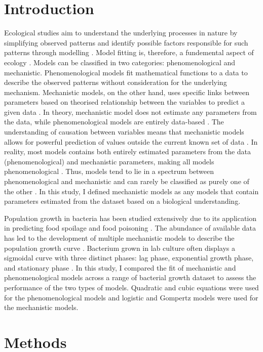 \documentclass[11pt, a4paper]{article}
\begin{document}
\section{Introduction}
Ecological studies aim to understand the underlying processes in nature by simplifying observed patterns and identify possible factors responsible for such patterns through modelling \cite{Johnson2004}. Model fitting is, therefore, a fundemental aspect of ecology \citep{Marquet2014}. Models can be classified in two categories: phenomenological and mechanistic. Phenomenological models fit mathematical functions to a data to describe the observed patterns without consideration for the underlying mechanism. Mechanistic models, on the other hand, uses specific links between parameters based on theorised relationship between the variables to predict a given data \cite{Jones2018}. In theory, mechanistic model does not estimate any parameters from the data, while phenomenological models are entirely data-based \citep{Lema-Perez2019}. The understanding of causation between variables means that mechanistic models allows for powerful prediction of values outside the current known set of data \cite{White2019}. In reality, most models contains both entirely estimated parameters from the data (phenomenological) and mechanistic parameters, making all models phenomenological \cite{White2019}. Thus, models tend to lie in a spectrum between phenomenological and mechanistic and can rarely be classified as purely one of the other \citep{Marquet2014}. In this study, I defined mechanistic models as any models that contain parameters estimated from the dataset based on a biological understanding. 

Population growth in bacteria has been studied extensively due to its application in predicting food spoilage and food poisoning \citep{Micha2011}. The abundance of available data has led to the development of multiple mechanistic models to describe the population growth curve \citep{Micha2011}. Bacterium grown in lab culture often displays a sigmoidal curve with three distinct phases: lag phase, exponential growth phase, and stationary phase \citep{Monod1949}. In this study, I compared the fit of mechanistic and phenomenological models across a range of bacterial growth dataset to assess the performance of the two types of models. Quadratic and cubic equations were used for the phenomenological models and logistic and Gompertz models were used for the mechanistic models. 


\section{Methods}
\end{document}
